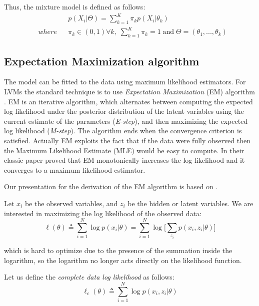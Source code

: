 Thus, the mixture model is defined as follows:
\begin{equation}
	\begin{aligned}
		& 
		& & p(X_{i}|\Theta) = \sum_{k=1}^{K}\pi_{k}p(X_{i}|\theta_{k}) \\
		& where 
		& & \pi_{k} \in (0, 1) \forall k, \; \sum_{k=1}^{K}\pi_{k} = 1  \; \text{and} \; \Theta = (\theta_{1},...,\theta_{k})
	\end{aligned}
\end{equation}

\subsection{Expectation Maximization algorithm}
The model can be fitted to the data using maximum likelihood estimators. For LVMs the standard technique is to use \emph{Expectation Maximization} (EM) algorithm \citep{Dempster1977}. EM is an iterative algorithm, which alternates between computing the expected log likelihood under the posterior distribution of the latent variables using the current estimate of the parameters (\emph{E-step}), and then maximizing the expected log likelihood (\emph{M-step}). The algorithm ends when the convergence criterion is satisfied. Actually EM exploits the fact that if the data were fully observed then the Maximum Likelihood Estimate (MLE) would be easy to compute. In their classic paper \cite{Dempster1977} proved that EM monotonically increases the log likelihood and it converges to a maximum likelihood estimator. 

Our presentation for the derivation of the EM algorithm is based on \cite[Ch. \ 11]{Murphy2012}.

Let $x_{i}$ be the observed variables, and $z_{i}$ be the hidden or latent variables. We are interested in maximizing the log likelihood of the observed data:
\begin{equation} \label{log-lik-observed-f}
	\ell(\theta) \triangleq \sum_{i=1}^{N} \log p(x_{i}|\theta) =  \sum_{i=1}^{N} \log \bigg[\sum_{z_{i}} p(x_{i}, z_{i}|\theta) \bigg]
\end{equation}

which is hard to optimize due to the presence of the summation inside the logarithm, so the logarithm no longer acts directly on the likelihood function.

Let us define the \emph{complete data log likelihood} as follows:
\begin{equation} \label{log-lik-observed-f}
	\ell_{c}(\theta) \triangleq \sum_{i=1}^{N} \log p(x_{i}, z_{i}|\theta)
\end{equation}

